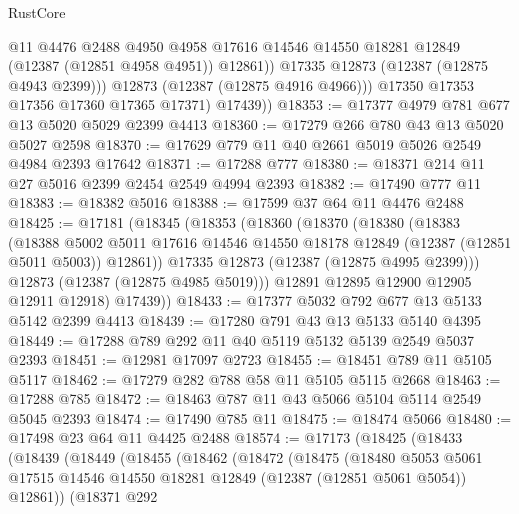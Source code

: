 \begin{lexlean}{RustCore}
\begin{coremodule}
                  @11
                  @4476
                  @2488
                  @4950
                  @4958
                  @17616
                  @14546
                  @14550
                  @18281
                  @12849
                  (@12387 (@12851 @4958 @4951))
                  @12861))
              @17335
              @12873
              (@12387 (@12875 @4943 @2399)))
            @12873
            (@12387 (@12875 @4916 @4966)))
          @17350
          @17353
          @17356
          @17360
          @17365
          @17371)
        @17439))
@18353 := @17377 @4979 @781 @677 @13 @5020 @5029 @2399 @4413
@18360 := @17279 @266 @780 @43 @13 @5020 @5027 @2598
@18370 := @17629 @779 @11 @40 @2661 @5019 @5026 @2549 @4984 @2393 @17642
@18371 := @17288 @777
@18380 := @18371 @214 @11 @27 @5016 @2399 @2454 @2549 @4994 @2393
@18382 := @17490 @777 @11
@18383 := @18382 @5016
@18388 := @17599 @37 @64 @11 @4476 @2488
@18425 := @17181
    (@18345
      (@18353
        (@18360
          (@18370
            (@18380
              (@18383
                (@18388
                  @5002
                  @5011
                  @17616
                  @14546
                  @14550
                  @18178
                  @12849
                  (@12387 (@12851 @5011 @5003))
                  @12861))
              @17335
              @12873
              (@12387 (@12875 @4995 @2399)))
            @12873
            (@12387 (@12875 @4985 @5019)))
          @12891
          @12895
          @12900
          @12905
          @12911
          @12918)
        @17439))
@18433 := @17377 @5032 @792 @677 @13 @5133 @5142 @2399 @4413
@18439 := @17280 @791 @43 @13 @5133 @5140 @4395
@18449 := @17288 @789 @292 @11 @40 @5119 @5132 @5139 @2549 @5037 @2393
@18451 := @12981 @17097 @2723
@18455 := @18451 @789 @11 @5105 @5117
@18462 := @17279 @282 @788 @58 @11 @5105 @5115 @2668
@18463 := @17288 @785
@18472 := @18463 @787 @11 @43 @5066 @5104 @5114 @2549 @5045 @2393
@18474 := @17490 @785 @11
@18475 := @18474 @5066
@18480 := @17498 @23 @64 @11 @4425 @2488
@18574 := @17173
    (@18425
      (@18433
        (@18439
          (@18449
            (@18455
              (@18462
                (@18472
                  (@18475
                    (@18480
                      @5053
                      @5061
                      @17515
                      @14546
                      @14550
                      @18281
                      @12849
                      (@12387 (@12851 @5061 @5054))
                      @12861))
                  (@18371
                    @292

\end{coremodule}
\end{lexlean}
